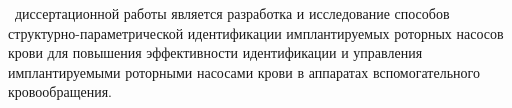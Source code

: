 

 \aim\ диссертационной работы является разработка и исследование способов структурно-параметрической идентификации имплантируемых роторных насосов крови для повышения эффективности идентификации и управления имплантируемыми роторными насосами крови в аппаратах вспомогательного кровообращения.


